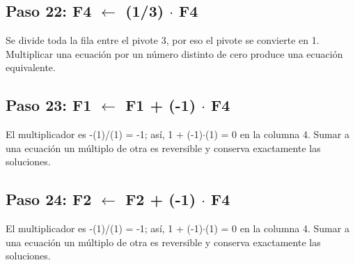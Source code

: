 \documentclass[conference]{IEEEtran}
\begin{document}
\medskip
\subsection*{Paso 22: F4 \(\leftarrow\) (1/3) \(\cdot\) F4}
Se divide toda la fila entre el pivote 3, por eso el pivote se convierte en 1. Multiplicar una ecuación por un número distinto de cero produce una ecuación equivalente.


\medskip
\subsection*{Paso 23: F1 \(\leftarrow\) F1 + (-1) \(\cdot\) F4}
El multiplicador es -(1)/(1) = -1; así, 1 + (-1)\(\cdot\)(1) = 0 en la columna 4. Sumar a una ecuación un múltiplo de otra es reversible y conserva exactamente las soluciones.


\medskip
\subsection*{Paso 24: F2 \(\leftarrow\) F2 + (-1) \(\cdot\) F4}
El multiplicador es -(1)/(1) = -1; así, 1 + (-1)\(\cdot\)(1) = 0 en la columna 4. Sumar a una ecuación un múltiplo de otra es reversible y conserva exactamente las soluciones.
\end{document}
